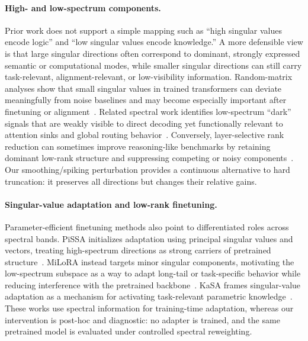 \paragraph{High- and low-spectrum components.}
Prior work does not support a simple mapping such as ``high singular values encode logic'' and ``low singular values encode knowledge.'' A more defensible view is that large singular directions often correspond to dominant, strongly expressed semantic or computational modes, while smaller singular directions can still carry task-relevant, alignment-relevant, or low-visibility information. Random-matrix analyses show that small singular values in trained transformers can deviate meaningfully from noise baselines and may become especially important after finetuning or alignment~\citep{small_singular_values_matter}. Related spectral work identifies low-spectrum ``dark'' signals that are weakly visible to direct decoding yet functionally relevant to attention sinks and global routing behavior~\citep{spectral_filters_dark_signals}. Conversely, layer-selective rank reduction can sometimes improve reasoning-like benchmarks by retaining dominant low-rank structure and suppressing competing or noisy components~\citep{laser}. Our smoothing/spiking perturbation provides a continuous alternative to hard truncation: it preserves all directions but changes their relative gains.

\paragraph{Singular-value adaptation and low-rank finetuning.}
Parameter-efficient finetuning methods also point to differentiated roles across spectral bands. PiSSA initializes adaptation using principal singular values and vectors, treating high-spectrum directions as strong carriers of pretrained structure~\citep{pissa}. MiLoRA instead targets minor singular components, motivating the low-spectrum subspace as a way to adapt long-tail or task-specific behavior while reducing interference with the pretrained backbone~\citep{milora}. KaSA frames singular-value adaptation as a mechanism for activating task-relevant parametric knowledge~\citep{kasa}. These works use spectral information for training-time adaptation, whereas our intervention is post-hoc and diagnostic: no adapter is trained, and the same pretrained model is evaluated under controlled spectral reweighting.


